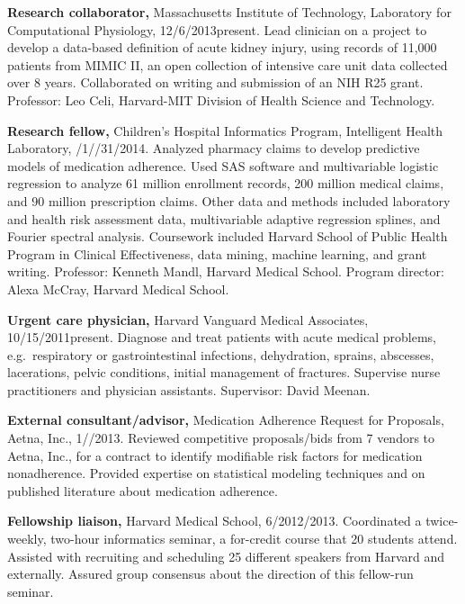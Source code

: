\documentclass[10pt]{article}
\begin{document}
\textbf{Research collaborator,} Massachusetts Institute of Technology,
Laboratory for Computational Physiology,
12/6/2013\ndash{}\linebreak[0]present. Lead clinician on a project to
develop a data-based definition of acute kidney injury, using records
of 11,000 patients from MIMIC II, an open collection of intensive care
unit data collected over 8 years. Collaborated on writing and
submission of an NIH R25 grant. Professor: Leo Celi, Harvard-MIT
Division of Health Science and Technology.

\textbf{Research fellow,} Children’s Hospital Informatics Program,
Intelligent Health Lab\-o\-ra\-to\-ry,
/1/\ndash{}/31/2014.
Analyzed pharmacy claims to develop predictive models of medication
adherence. Used SAS software and multivariable logistic regression to
analyze 61 million enrollment records, 200 million medical claims, and
90 million prescription claims. Other data and methods included
laboratory and health risk assessment data, multivariable adaptive
regression splines, and Fourier spectral analysis. Coursework included
Harvard School of Public Health Program in Clinical Effectiveness,
data mining, machine learning, and grant writing. Professor: Kenneth
Mandl, Harvard Medical School. Program director: Alexa McCray, Harvard
Medical School.

\textbf{Urgent care physician,} Harvard Vanguard Medical Associates,
10/15/2011\ndash{}present. Diagnose and treat patients with acute
medical problems, e.g.\ respiratory or gastrointestinal infections,
dehydration, sprains, abscesses, lacerations, pelvic conditions,
initial management of fractures. Supervise nurse practitioners and
physician assistants. Supervisor: David Meenan.

\textbf{External consultant/advisor,} Medication Adherence Request for
Proposals, Aetna, Inc.,
1/\ndash{}/2013. Reviewed competitive
proposals/bids from 7 vendors to Aetna, Inc., for a contract to
identify modifiable risk factors for medication nonadherence. Provided
expertise on statistical modeling techniques and on published
literature about medication adherence.

\textbf{Fellowship liaison,} Harvard Medical School,
6/2012/2013. Coordinated a twice-week\-ly, two-hour informatics
seminar, a for-credit course that 20 students attend. Assisted with
recruiting and scheduling 25 different speakers from Harvard and
externally. Assured group consensus about the direction of this
fellow-run seminar.
\end{document}
